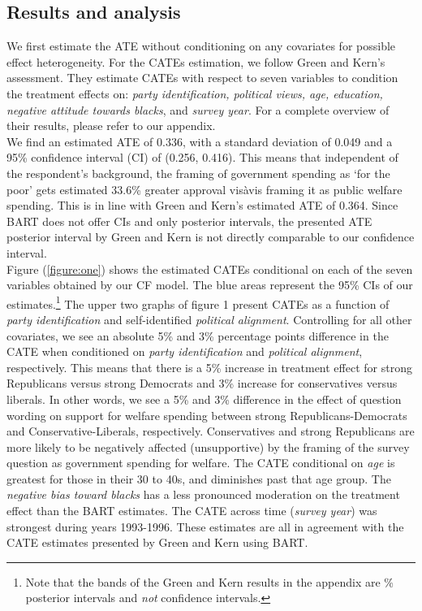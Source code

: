 \documentclass[12pt]{article}
\begin{document}
\subsection{Results and analysis}
We first estimate the ATE without conditioning on any covariates for possible
effect heterogeneity. For the CATEs estimation, we follow Green and Kern's assessment. They estimate
CATEs with respect to seven variables to condition the treatment effects on:
\textit{party identification, political views, age, education, negative attitude
towards blacks}, and \textit{survey year}. For a complete overview of their
results, please refer to our appendix. \\ 

We find an estimated ATE of 0.336, with a standard deviation of 0.049 and a 95\%
confidence interval (CI) of (0.256, 0.416). This means that independent of the respondent's background, the framing of government spending as `for the poor' gets estimated 33.6\% greater approval vis\-à\-vis framing it as public welfare spending. This is in line with Green and
Kern's estimated ATE of 0.364. Since BART does not offer CIs and only posterior
intervals, the presented ATE posterior interval by Green and Kern is not directly
comparable to our confidence interval. 
\\

Figure (\ref{figure:one}) shows the estimated CATEs conditional on each of the seven variables
obtained by our CF model. The blue areas represent the 95\% CIs of our
estimates.\footnote{Note that the bands of the Green and Kern results in the appendix are \% posterior intervals and \textit{not} confidence intervals.}
The upper two graphs of figure 1 present CATEs as a function of \textit{party
identification} and self-identified \textit{political alignment}. Controlling
for all other covariates, we see an absolute 5\% and 3\% percentage points
difference in the CATE when conditioned on \textit{party identification} and
\textit{political alignment}, respectively. This means that there is a 5\%
increase in treatment effect for strong Republicans versus strong Democrats and
3\% increase for conservatives versus liberals. In other words, we see a 5\% and
3\% difference in the effect of question wording on support for welfare spending
between strong Republicans-Democrats and Conservative-Liberals, respectively.
Conservatives and strong Republicans are more likely to be negatively affected
(unsupportive) by the framing of the survey question as government spending for
welfare. The CATE conditional on \textit{age} is greatest for those in their 30
to 40s, and diminishes past that age group. The \textit{negative bias toward
blacks} has a less pronounced moderation on the treatment effect than the BART
estimates. The CATE across time (\textit{survey year}) was strongest during
years 1993-1996. These estimates are all in agreement with the CATE estimates
presented by Green and Kern using BART. \\
\end{document}
